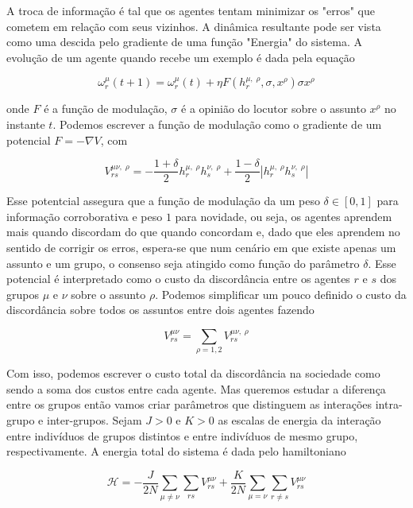 \documentclass[a4paper, 11pt]{article} %
\newcommand{\agent}[2]{%
    \omega^{#2}_{#1}}
\newcommand{\subpot}{\ensuremath{\displaystyle%
    V_{rs}^{\mu \nu,\; \rho}}}
\newcommand{\pot}{\ensuremath{\displaystyle%
    V_{rs}^{\mu \nu}}}
\newcommand{\opn}[2]{\ensuremath{\displaystyle%
    h^{#2,\;\rho}_{#1}}}
\renewcommand{\H}{%
    \mathcal{H}}
\begin{document}
A troca de informação é tal que os agentes tentam minimizar os "erros" que
cometem em relação com seus vizinhos. A dinâmica resultante pode ser vista como
uma descida pelo gradiente de uma função "Energia" do sistema. A evolução de um
agente quando recebe um exemplo é dada pela equação

\begin{equation}
    \agent{r}{\mu}(t+1)=\agent{r}{\mu}(t)+\eta F(\opn{r}{\mu},\sigma, x^{\rho})
    \sigma x^{\rho}
\end{equation}

onde $F$ é a função de modulação, $\sigma$ é a opinião do locutor sobre o
assunto $x^{\rho}$ no instante $t$. Podemos escrever a função de modulação como 
o gradiente de um potencial $ F = -\nabla V $, com

\begin{equation}\label{subject-potential}
    \subpot = -\frac{1+\delta}{2}\opn{r}{\mu}\opn{s}{\nu}
                      +\frac{1-\delta}{2}|\opn{r}{\mu}\opn{s}{\nu}|
\end{equation}

Esse potentcial assegura que a função de modulação da um peso $\delta \in [0,1]$
para informação corroborativa e peso $1$ para novidade, ou seja, os agentes
aprendem mais quando discordam do que quando concordam e, dado que eles aprendem
no sentido de corrigir os erros, espera-se que num cenário em que existe apenas
um assunto e um grupo, o consenso seja atingido como função do parâmetro
$\delta$. Esse potencial é interpretado como o custo da discordância entre os
agentes $r$ e $s$ dos grupos $\mu$ e $\nu$ sobre o assunto $\rho$. Podemos
simplificar um pouco definido o custo da discordância sobre todos os assuntos
entre dois agentes fazendo 

\begin{equation}\label{pair-potential}
    \pot = \sum_{\rho=1,2} \subpot
\end{equation}

Com isso, podemos escrever o custo total da discordância na sociedade como sendo
a soma dos custos entre cada agente. Mas queremos estudar a diferença entre os
grupos então vamos criar parâmetros que distinguem as interações intra-grupo e
inter-grupos. Sejam $J>0$ e $K>0$ as escalas de energia da interação entre
indivíduos de grupos distintos e entre indivíduos de mesmo grupo,
respectivamente. A energia total do sistema é dada pelo hamiltoniano

\begin{equation}
    \H = -\frac{J}{2N}\sum_{\mu \ne \nu}\sum_{rs}\pot
                 +\frac{K}{2N}\sum_{\mu=\nu}\sum_{r\ne s}\pot
\end{equation}
\end{document}
